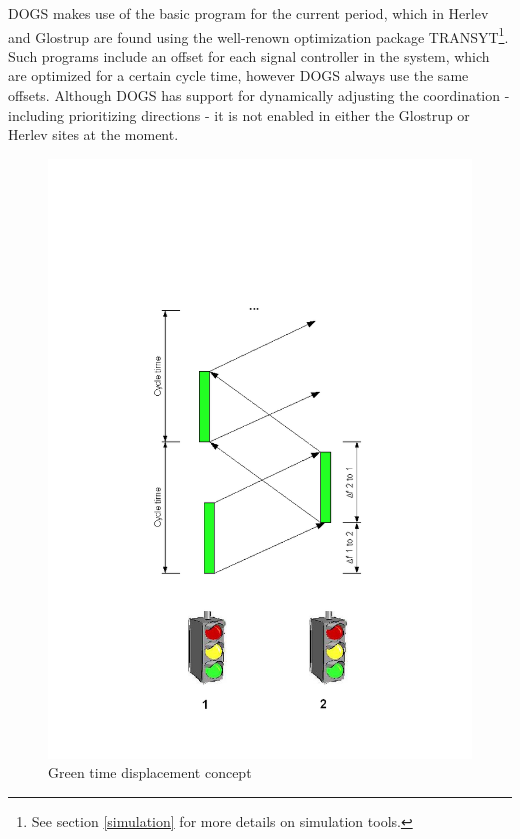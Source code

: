 DOGS makes use of the basic program for the current period, which in Herlev and Glostrup are found using the well-renown optimization package TRANSYT\footnote{See section \ref{simulation} for more details on simulation	tools.}. Such programs include an offset for each signal controller in the system, which are optimized for a certain cycle time, however DOGS always use the same offsets. Although DOGS has support for dynamically adjusting the coordination - including prioritizing directions - it is not enabled in either the Glostrup or Herlev sites at the moment.

\begin{figure}[htb]
\centering
\includegraphics[scale=0.5]{green_time_displacement_and_cycle_time.png} 
\caption{Green time displacement concept}
\label{fig:green_time_displacement_concept}
\end{figure}

